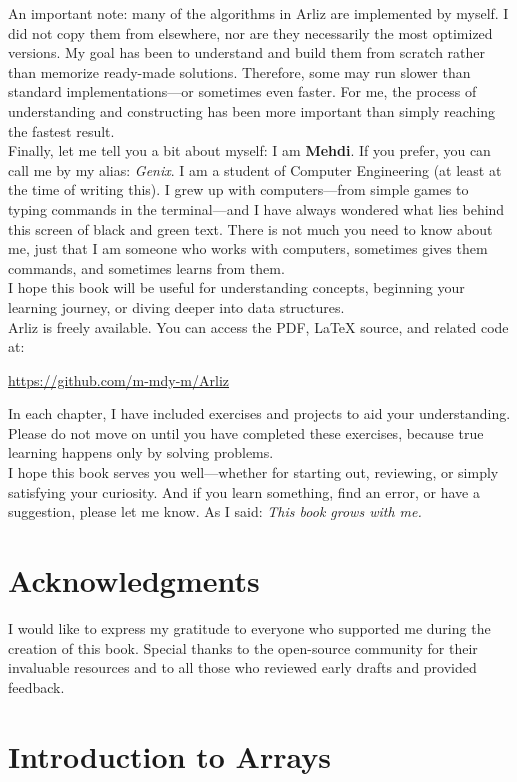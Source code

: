 \documentclass[12pt, oneside]{book}
\begin{document}
	An important note: many of the algorithms in Arliz are implemented by myself. I did not copy them from elsewhere, nor are they necessarily the most optimized versions. My goal has been to understand and build them from scratch rather than memorize ready-made solutions. Therefore, some may run slower than standard implementations—or sometimes even faster. For me, the process of understanding and constructing has been more important than simply reaching the fastest result.\\	
	Finally, let me tell you a bit about myself:  
	I am \textbf{Mehdi}. If you prefer, you can call me by my alias: \emph{Genix}. I am a student of Computer Engineering (at least at the time of writing this). I grew up with computers—from simple games to typing commands in the terminal—and I have always wondered what lies behind this screen of black and green text. There is not much you need to know about me, just that I am someone who works with computers, sometimes gives them commands, and sometimes learns from them.\\	
	I hope this book will be useful for understanding concepts, beginning your learning journey, or diving deeper into data structures. \\	
	Arliz is freely available. You can access the PDF, LaTeX source, and related code at:  
	\begin{center}
		\url{https://github.com/m-mdy-m/Arliz}
	\end{center}
	In each chapter, I have included exercises and projects to aid your understanding. Please do not move on until you have completed these exercises, because true learning happens only by solving problems.\\	
	I hope this book serves you well—whether for starting out, reviewing, or simply satisfying your curiosity. And if you learn something, find an error, or have a suggestion, please let me know. As I said:
	\emph{This book grows with me.}
	
	\chapter*{Acknowledgments}
	I would like to express my gratitude to everyone who supported me during the creation of this book. Special thanks to the open-source community for their invaluable resources and to all those who reviewed early drafts and provided feedback.
		
	\mainmatter
	\chapter{Introduction to Arrays}
	
\end{document}

